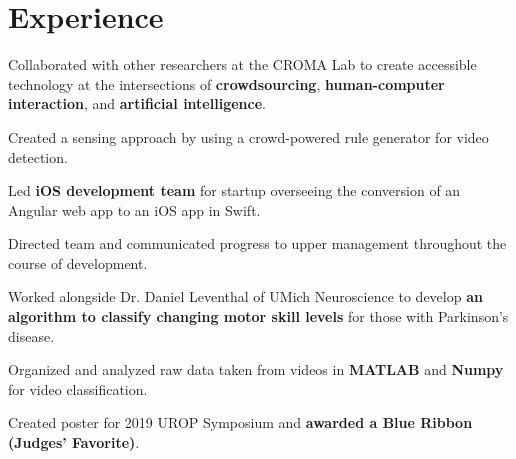 \documentclass{hreeves_resume}
\begin{document}
\begin{minipage}[t]{0.6\linewidth}



\section{Experience}

\infosep


\vspace{\topsep}
\begin{smallItemize}
\item Collaborated with other researchers at the CROMA Lab to create accessible technology at the intersections of \textbf{crowdsourcing}, \textbf{human-computer interaction}, and \textbf{artificial intelligence}.
\item Created a sensing approach by using a crowd-powered rule generator for video detection.
\end{smallItemize}

\infosep


\begin{smallItemize}
\item Led \textbf{iOS development team} for startup overseeing the conversion of an Angular web app to an iOS app in Swift.
\item Directed team and communicated progress to upper management throughout the course of development.
\end{smallItemize}

\infosep

\begin{smallItemize}
\item Worked alongside Dr. Daniel Leventhal of UMich Neuroscience to develop \textbf{an algorithm to classify changing motor skill levels} for those with Parkinson’s disease.
\item Organized and analyzed raw data taken from videos in \textbf{MATLAB} and \textbf{Numpy} for video classification.
\item Created poster for 2019 UROP Symposium and \textbf{awarded a Blue Ribbon (Judges’ Favorite)}.
\end{smallItemize}


\end{minipage}
\end{document}

